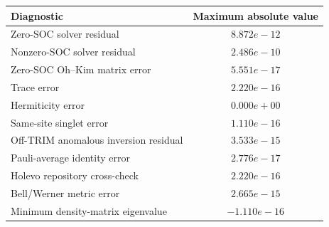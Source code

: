 \begin{tabular}{lc}
\toprule
Diagnostic & Maximum absolute value \\
\midrule
Zero-SOC solver residual & $8.872e-12$ \\
Nonzero-SOC solver residual & $2.486e-10$ \\
Zero-SOC Oh--Kim matrix error & $5.551e-17$ \\
Trace error & $2.220e-16$ \\
Hermiticity error & $0.000e+00$ \\
Same-site singlet error & $1.110e-16$ \\
Off-TRIM anomalous inversion residual & $3.533e-15$ \\
Pauli-average identity error & $2.776e-17$ \\
Holevo repository cross-check & $2.220e-16$ \\
Bell/Werner metric error & $2.665e-15$ \\
Minimum density-matrix eigenvalue & $-1.110e-16$ \\
\bottomrule
\end{tabular}
